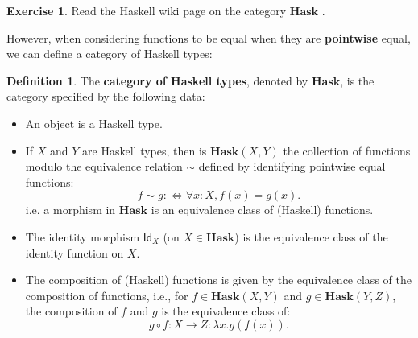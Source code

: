 \documentclass[a4paper,10pt]{scrartcl}
\theoremstyle{plain}
\theoremstyle{definition}
\newtheorem{dfn}[thm]{Definition}
\newtheorem{exer}[thm]{Exercise}
\newcommand{\cfont}[1]{\ensuremath{\mathsf{#1}}}
\newcommand{\Catb}[1]{\mathbf{#1}}
\newcommand{\HASK}{\Catb{Hask}}
\newcommand{\CHom}[3]{{#1}(#2,#3)}
\newcommand{\Id}[1][]{\cfont{Id}_{#1}}
\begin{document}

\begin{exer}
  Read the Haskell wiki page on the category $\HASK$ \cite{haskell-wiki-hask}.
\end{exer}


However, when considering functions to be equal when they are \textbf{pointwise} equal, we can define a category of Haskell types:
\begin{dfn}\label{example:hask} The \textbf{category of Haskell types}, denoted by $\HASK$, is the category specified by the following data:
\begin{itemize}
\item An object is a Haskell type.
\item If $X$ and $Y$ are Haskell types, then is $\CHom \HASK X Y$ the collection of functions modulo the equivalence relation $\sim$ defined by identifying pointwise equal functions:
\[
f \sim g :\iff \forall x : X, f(x) = g(x).
\]
i.e. a morphism in $\HASK$ is an equivalence class of (Haskell) functions.
\item The identity morphism $\Id[X]$ (on $X\in\HASK$) is the equivalence class of the identity function on $X$.
\item The composition of (Haskell) functions is given by the equivalence class of the composition of functions, i.e., for $f\in \CHom \HASK X Y$ and $g\in \CHom \HASK Y Z$, the composition of $f$ and $g$ is the equivalence class of:
\[g\circ f : X\to Z: \lambda x. g(f(x)).\]
\end{itemize}
\end{dfn}
\end{document}
